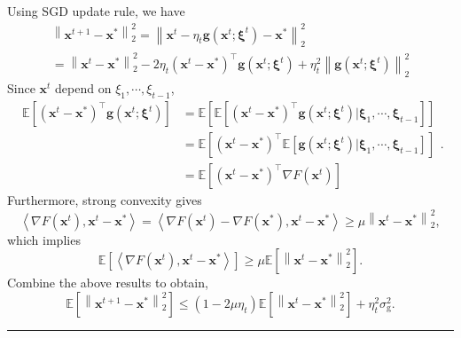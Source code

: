 \documentclass[12pt]{article}
\numberwithin{equation}{section}
\newenvironment{proof}{{\bf Proof:}}{\hfill\rule{2mm}{2mm}}
\begin{document}
\begin{proof}
	Using SGD update rule, we have
	$$
	\begin{array}{l}{\left\|\boldsymbol{x}^{t+1}-\boldsymbol{x}^{*}\right\|_{2}^{2}=\left\|\boldsymbol{x}^{t}-\eta_{t} \boldsymbol{g}\left(\boldsymbol{x}^{t} ; \boldsymbol{\xi}^{t}\right)-\boldsymbol{x}^{*}\right\|_{2}^{2}} \\ {=\left\|\boldsymbol{x}^{t}-\boldsymbol{x}^{*}\right\|_{2}^{2}-2 \eta_{t}\left(\boldsymbol{x}^{t}-\boldsymbol{x}^{*}\right)^{\top} \boldsymbol{g}\left(\boldsymbol{x}^{t} ; \boldsymbol{\xi}^{t}\right)+\eta_{t}^{2}\left\|\boldsymbol{g}\left(\boldsymbol{x}^{t} ; \boldsymbol{\xi}^{t}\right)\right\|_{2}^{2}}\end{array}
	$$
	Since $\boldsymbol{x}^{t}$ depend on $\xi_{1}, \cdots, \xi_{t-1}$, 
	$$
	\begin{aligned} \mathbb{E}\left[\left(\boldsymbol{x}^{t}-\boldsymbol{x}^{*}\right)^{\top} \boldsymbol{g}\left(\boldsymbol{x}^{t} ; \boldsymbol{\xi}^{t}\right)\right] &=\mathbb{E}\left[\mathbb{E}\left[\left(\boldsymbol{x}^{t}-\boldsymbol{x}^{*}\right)^{\top} \boldsymbol{g}\left(\boldsymbol{x}^{t} ; \boldsymbol{\xi}^{t}\right) | \boldsymbol{\xi}_{1}, \cdots, \boldsymbol{\xi}_{t-1}\right]\right] \\ &=\mathbb{E}\left[\left(\boldsymbol{x}^{t}-\boldsymbol{x}^{*}\right)^{\top} \mathbb{E}\left[\boldsymbol{g}\left(\boldsymbol{x}^{t} ; \boldsymbol{\xi}^{t}\right) | \boldsymbol{\xi}_{1}, \cdots, \boldsymbol{\xi}_{t-1}\right]\right] \\ &=\mathbb{E}\left[\left(\boldsymbol{x}^{t}-\boldsymbol{x}^{*}\right)^{\top} \nabla F\left(\boldsymbol{x}^{t}\right)\right] \end{aligned}.
	$$
	Furthermore, strong convexity gives
	$$
	\left\langle\nabla F\left(\boldsymbol{x}^{t}\right), \boldsymbol{x}^{t}-\boldsymbol{x}^{*}\right\rangle=\left\langle\nabla F\left(\boldsymbol{x}^{t}\right)-\nabla F\left(\boldsymbol{x}^{*}\right), \boldsymbol{x}^{t}-\boldsymbol{x}^{*}\right\rangle \geq \mu\left\|\boldsymbol{x}^{t}-\boldsymbol{x}^{*}\right\|_{2}^{2},
	$$
	which implies
	$$
	\mathbb{E}\left[\left\langle\nabla F\left(\boldsymbol{x}^{t}\right), \boldsymbol{x}^{t}-\boldsymbol{x}^{*}\right\rangle\right] \geq \mu \mathbb{E}\left[\left\|\boldsymbol{x}^{t}-\boldsymbol{x}^{*}\right\|_{2}^{2}\right].
	$$
	Combine the above results to obtain,
	$$
	\mathbb{E}\left[\left\|\boldsymbol{x}^{t+1}-\boldsymbol{x}^{*}\right\|_{2}^{2}\right] \leq\left(1-2 \mu \eta_{t}\right) \mathbb{E}\left[\left\|\boldsymbol{x}^{t}-\boldsymbol{x}^{*}\right\|_{2}^{2}\right]+\eta_{t}^{2} \sigma_{\mathrm{g}}^{2}.
$$
\end{proof}
\end{document}
